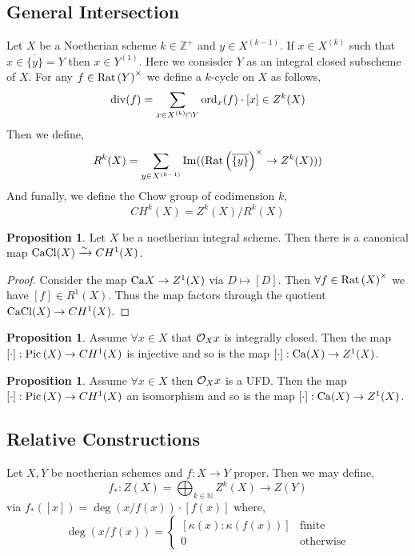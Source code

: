 \documentclass[12pt]{extarticle}
\newcommand{\Z}{\mathbb{Z}}
\newcommand{\N}{\mathbb{N}}
\renewcommand{\Im}[1]{\mathrm{Im}(#1)}
\theoremstyle{definition}
\newtheorem{proposition}[theorem]{Proposition}
\begin{document}
\subsection{General Intersection}

Let $X$ be a Noetherian scheme $k \in \Z^+$ and $y \in X^{(k-1)}$. If $x \in X^{(k)}$ such that $x \in \overline{\{ y \}} = Y$ then $x \in Y^{(1)}$. Here we consisder $Y$ as an integral closed subscheme of $X$. For any $f \in \mathrm{Rat} \left( Y \right)^\times$ we define a $k$-cycle on $X$ as follows,
\[ \mathrm{div}{(f)} = \sum_{x \in X^{(k)} \cap Y} \mathrm{ord}_x(f) \cdot [x] \in Z^k(X) \]
Then we define,
\[ R^k(X) = \sum_{y \in X^{(k-1)}} \Im{(\Rat{\overline{\{y \}}}^\times \to Z^k(X))} \]
And funally, we define the Chow group of codimension $k$,
\[ CH^k(X) = Z^k(X) / R^k(X) \]

\begin{proposition}
Let $X$ be a noetherian integral scheme. Then there is a canonical map $\mathrm{CaCl}(X) \xrightarrow{\sim} CH^1(X)$.
\end{proposition}

\begin{proof}
Consider the map $\mathrm{Ca}{X} \to Z^1(X)$ via $D \mapsto [D]$. Then $\forall f \in \mathrm{Rat} \left( X \right)^\times$ we have $[f] \in R^1(X)$. Thus the map factors through the quotient $\mathrm{CaCl}(X) \to CH^1(X)$. 
\end{proof}

\begin{proposition}
Assume $\forall x \in X$ that $\mathcal{O}_{X}{x}$ is integrally closed. Then the map $[\cdot] : \mathrm{Pic}\left( X \right) \to CH^1(X)$ is injective and so is the map $[\cdot] : \mathrm{Ca}(X) \to Z^1(X)$. 
\end{proposition}

\begin{proposition}
Assume $\forall x \in X$ then $\mathcal{O}_{X}{x}$ is a UFD. Then the map $[\cdot] : \mathrm{Pic}\left( X \right) \to CH^1(X)$ an isomorphism and so is the map $[\cdot] : \mathrm{Ca}(X) \to Z^1(X)$. 
\end{proposition}

\subsection{Relative Constructions}

Let $X, Y$ be noetherian schemes and $f : X \to Y$ proper. Then we may define,
\[ f_* : Z(X) = \bigoplus_{k \in \N} Z^k(X) \to Z(Y) \]
via $f_*([x]) = \deg(x / f(x)) \cdot [f(x)]$ where,
\[ \deg(x / f(x)) = \begin{cases}
[\kappa(x) : \kappa(f(x))] & \text{finite}
\\
0 & \text{otherwise} 
\end{cases} \]
\end{document}
